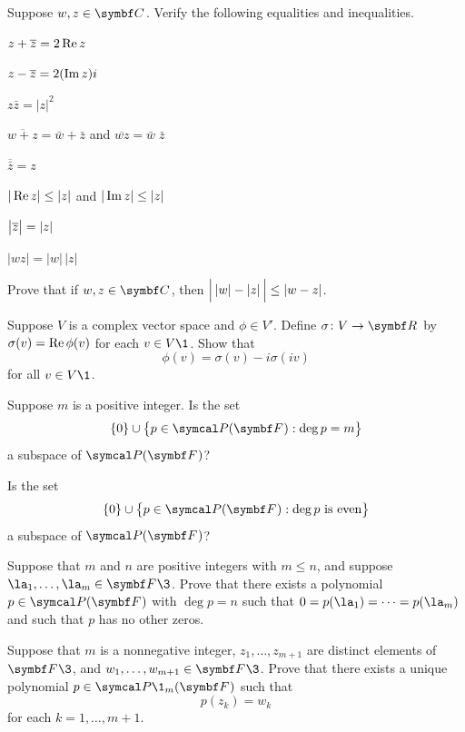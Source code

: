 \begin{exercises}

\exercise
Suppose $w, z \in \C{}$. Verify the following equalities and inequalities.
\begin{subtheorem} \addtolength{\itemsep}{3bp}
\item
$z + \bar{z} = 2 \re z$

\item
$z - \bar{z} = 2( \im z)i$

\item
$z \bar{z} = |z|^2$

\item
$\overline{w + z} = \bar{w} + \bar{z}$  and $\overline{wz} = \bar{w} \; \bar{z}$

\item
$\overline{\bar{z}} = z$

\item
$| \re z | \le |z|$ and $| \im z | \le |z|$

\item
$\abs[\big]{\bar{z}} = |z|$

\item
$|wz| = |w|\,|z|$
\end{subtheorem}


\exercise
Prove that if $w, z \in \C{}$, then $\abs[\Big]{\, \abs{w} - \abs{z} \,} \le \abs{w-z}$. \label{4reverse}


\exercise
Suppose $V$ is a complex vector space and $\phi \in V'\!$. Define $\fun \sigma V {\R{}}$ by
$\sigma(v) = \re \phi(v)$ for each $v \in V\1$. Show that
\[
\phi(v) = \sigma(v) - i \sigma(iv)
\]
for all $v \in V\1$.


\exercise
Suppose $m$ is a positive integer.  Is the set
\[
\{0\} \cup \br[\big]{p \in \P(\F{}): \deg p = m}
\]
a subspace of $\P(\F{})$?


\exercise
Is the set
\[
\{0\} \cup \br[\big]{p \in \P(\F{}): \deg p \text{ is even}}
\]
a subspace of $\P(\F{})$?


\exercise
Suppose that $m$ and $n$ are positive integers with $m \le n$, and suppose $\la_1, \dots, \la_m \in \F{}\3$. Prove that there exists a polynomial $p \in \P(\F{})$ with $\deg p = n$ such that $0 = p(\la_1) = \dots = p(\la_m)$ and such that $p$ has no other zeros.


\exercise
Suppose that $m$ is a nonnegative integer, $z_1, \dots, z_{m+1}$ are distinct elements of $\F{}\3$, and
$w_1, \dots, w_{m+1} \in \F{}\3$.  Prove that there exists a unique polynomial
$p \in \P\1_m(\F{})$ such that \label{PolyInterpolation}
\[
p(z_k) = w_k
\]
for each $k = 1, \dots, m + 1$.



\end{exercises}
